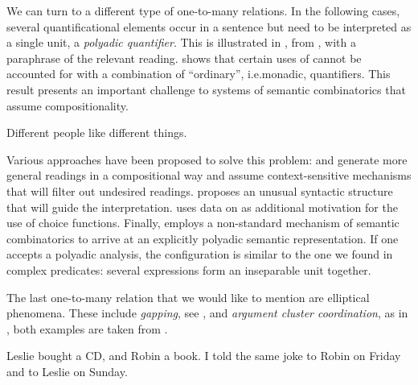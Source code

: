 \documentclass[output=paper]{langscibook}
\begin{document}
We can turn to a different type of one-to-many relations.
In the following cases, several quantificational elements occur in a
sentence but need to be interpreted as a single unit, a \emph{polyadic
  quantifier}. This is illustrated in , from \citet{Keenan:92},
with a paraphrase of the relevant reading.
 \citet{Keenan:92} shows that certain uses of  cannot be accounted for with a combination of ``ordinary'', i.e.\@ monadic, quantifiers. 
This result presents an important challenge 
to systems of semantic combinatorics that assume compositionality.
%


\begin{exe}
  \ex
  \label{ex-different}
  Different people like different things.\\
\end{exe}


\begin{sloppypar}
  Various approaches have been proposed to solve this problem:
  \citet{Moltmann:95} and \citet{Beck:06} generate more general
  readings in a compositional way and assume context-sensitive
  mechanisms that will filter out undesired readings.
  \citet{Barker:07} proposes an unusual syntactic structure that will
  guide the interpretation.  \citet{Lahm:2016} uses data on
   as additional motivation for the use of choice
  functions.  Finally, \citet{Richter:16} employs a non-standard
  mechanism of semantic combinatorics to arrive at an explicitly
  polyadic semantic representation.  If one accepts a polyadic
  analysis, the configuration is similar to the one we found in
  complex predicates: several expressions form an inseparable unit
  together.
\end{sloppypar}

The last one-to-many relation that we would like to mention are elliptical phenomena. 
These include \emph{gapping}, see , and \emph{argument cluster coordination}, as in , both examples are taken from \citet{Kubota:Levine:16-Gapping}.

\ea \label{ex-gap-acc}
\begin{xlist}
\ex
\label{ex-gapping}
Leslie bought a CD, and Robin a book.
%
\ex \label{ex-acc}
I told the same joke to Robin on Friday and to Leslie on Sunday. \citep{Kubota:Levine:16-Gapping}
\end{xlist}
\z 
\end{document}
